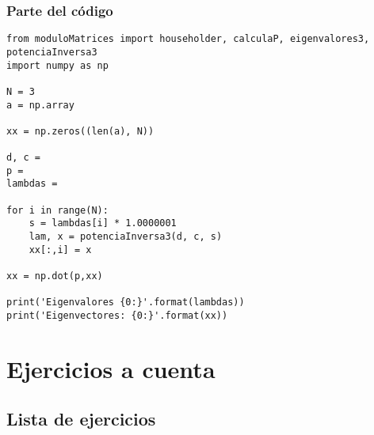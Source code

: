\documentclass[12pt]{beamer}
\begin{document}
\begin{frame}
\frametitle{Parte del código}
\begin{lstlisting}[caption=Parte del código que resuelve el ejercicio]
from moduloMatrices import householder, calculaP, eigenvalores3, potenciaInversa3
import numpy as np

N = 3
a = np.array

xx = np.zeros((len(a), N))

d, c = 
p = 
lambdas = 

for i in range(N):
    s = lambdas[i] * 1.0000001
    lam, x = potenciaInversa3(d, c, s)
    xx[:,i] = x

xx = np.dot(p,xx)

print('Eigenvalores {0:}'.format(lambdas))
print('Eigenvectores: {0:}'.format(xx))
\end{lstlisting}
\end{frame}

\section{Ejercicios a cuenta}
\subsection{Lista de ejercicios}
\end{document}
